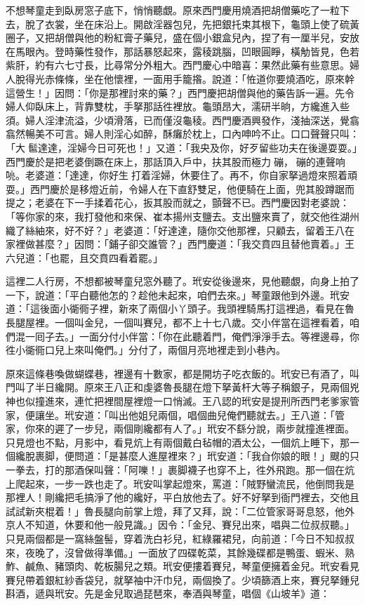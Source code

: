不想琴童走到臥房窓子底下，悄悄聽覷。原來西門慶用燒酒把胡僧藥吃了一粒下去，脫了衣裳，坐在床沿上。開啟淫器包兒，先把銀托束其根下，龜頭上使了硫黃圈子，又把胡僧與他的粉紅膏子藥兒，盛在個小銀盒兒內，捏了有一厘半兒，安放在馬眼內。登時藥性發作，那話暴怒起來，露稜跳腦，凹眼圓睜，橫觔皆見，色若紫肝，約有六七寸長，比尋常分外粗大。西門慶心中暗喜：果然此藥有些意思。婦人脫得光赤條條，坐在他懷裡，一面用手籠揝。說道：「恠道你要燒酒吃，原來幹這營生！」因問：「你是那裡討來的藥？」西門慶把胡僧與他的藥告訴一遍。先令婦人仰臥床上，背靠雙枕，手拏那話徃裡放。龜頭昂大，濡研半晌，方纔進入些須。婦人淫津流溢，少頃滑落，已而僅沒龜稜。西門慶酒興發作，淺抽深送，覺翕翕然暢美不可言。婦人則淫心如醉，酥癱於枕上，口內呻吟不止。口口聲聲只叫：「大𩫻䯲達達，淫婦今日可死也！」又道：「我央及你，好歹留些功夫在後邊耍耍。」{}西門慶於是把老婆倒蹶在床上，那話頂入戶中，扶其股而極力𢵞磞，𢵞磞的連聲响喨。老婆道：「達達，你好生𢵞打着淫婦，休要住了。再不，你自家拏過燈來照着頑耍。」西門慶於是移燈近前，令婦人在下直舒雙足，他便騎在上面，兜其股蹲踞而提之；老婆在下一手揉着花心，扳其股而就之，顫聲不已。西門慶因對老婆說：「等你家的來，我打發他和來保、崔本揚州支鹽去。支出鹽來賣了，就交他徃湖州織了絲紬來，好不好？」老婆道：「好達達，隨你交他那裡，只顧去，留着王八在家裡做甚麼？」因問：「鋪子卻交誰管？」西門慶道：「我交賁四且替他賣着。」王六兒道：「也罷，且交賁四看着罷。」

這裡二人行房，不想都被琴童兒窓外聽了。玳安從後邊來，見他聽覷，向身上拍了一下，說道：「平白聽他怎的？趁他未起來，咱們去來。」琴童跟他到外邊。玳安道：「這後面小衚衕子裡，新來了兩個小丫頭子。我頭裡騎馬打這裡過，看見在魯長腿屋裡。一個叫金兒，一個叫賽兒，都不上十七八歲。交小伴當在這裡看着，咱們混一囘子去。」一面分付小伴當：「你在此聽着門，俺們淨淨手去。等裡邊尋，你徃小衚衕口兒上來叫俺們。」分付了，兩個月亮地裡走到小巷內。

原來這條巷喚做蝴蝶巷，裡邊有十數家，都是開坊子吃衣飯的。玳安已有酒了，叫門叫了半日纔開。原來王八正和虔婆魯長腿在燈下拏黃杆大等子稱銀子，見兩個兇神也似撞進來，連忙把裡間屋裡燈一口悄滅。王八認的玳安是提刑所西門老爹家管家，便讓坐。玳安道：「叫出他姐兒兩個，唱個曲兒俺們聽就去。」王八道：「管家，你來的遲了一步兒，兩個剛纔都有人了。」玳安不繇分說，兩步就撞進裡面。只見燈也不點，月影中，看見炕上有兩個戴白毡帽的酒太公，一個炕上睡下，那一個纔脫裹脚，便問道：「是甚麼人進屋裡來？」玳安道：「我㒲你娘的眼！」颼的只一拳去，打的那酒保叫聲：「阿嚛！」裹脚襪子也穿不上，徃外飛跑。那一個在炕上爬起來，一步一跌也走了。玳安叫掌起燈來，罵道：「賊野蠻流民，他倒問我是那裡人！剛纔把毛搞淨了他的纔好，平白放他去了。好不好拏到衙門裡去，交他且試試新夾棍着！」魯長腿向前掌上燈，拜了又拜，說：「二位管家哥哥息怒，他外京人不知道，休要和他一般見識。」因令：「金兒、賽兒出來，唱與二位叔叔聽。」只見兩個都是一窩絲盤髻，穿着洗白衫兒，紅綠羅裙兒，向前道：「今日不知叔叔來，夜晚了，沒曾做得準備。」一面放了四碟乾菜，其餘幾碟都是鴨蛋、蝦米、熟鮓、鹹魚、豬頭肉、乾板腸兒之類。{}玳安便摟着賽兒，琴童便擁着金兒。玳安看見賽兒帶着銀紅紗香袋兒，就拏袖中汗巾兒，兩個換了。少頃篩酒上來，賽兒拏鍾兒斟酒，遞與玳安。先是金兒取過琵琶來，奉酒與琴童，唱個《山坡羊》道：

